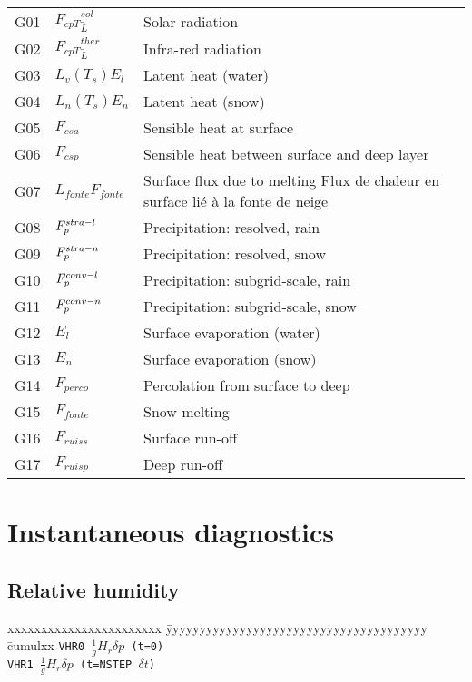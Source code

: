 \begin{itemize}
        \begin{tabular}{lll}
          G01 & ${F_{cp T}}_{\tilde{L}}^{sol}$ & Solar radiation \\
          G02 & ${F_{cp T}}_{\tilde{L}}^{ther}$ & Infra-red radiation\\
          G03 & $L_v(T_s)E_l$ & Latent heat (water) \\
          G04 & $L_n(T_s)E_n$ & Latent heat (snow) \\
          G05 & $F_{csa}$ & Sensible heat at surface \\
          G06 & $F_{csp}$ & Sensible heat between surface and deep layer \\
          G07 & $L_{fonte} F_{fonte}$ & Surface flux due to melting Flux de chaleur en surface lié à la fonte de neige \\
          G08 & $F_{p}^{stra-l}$ & Precipitation: resolved, rain \\
          G09 & $F_{p}^{stra-n}$ & Precipitation: resolved, snow \\
          G10 & $F_{p}^{conv-l}$ & Precipitation: subgrid-scale, rain \\
          G11 & $F_{p}^{conv-n}$ & Precipitation: subgrid-scale, snow \\
          G12 & $E_l$ & Surface evaporation (water) \\
          G13 & $E_n$ & Surface evaporation (snow) \\
          G14 & $F_{perco}$ & Percolation from surface to deep \\
          G15 & $F_{fonte}$ & Snow melting \\
          G16 & $F_{ruiss}$ & Surface run-off \\
          G17 & $F_{ruisp}$ & Deep run-off 
        \end{tabular}
\end{itemize}
\section{Instantaneous diagnostics }
\subsection{Relative humidity}


\begin{tabbing}
xxxxxxxxxxxxxxxxxxxxxxx \= yyyyyyyyyyyyyyyyyyyyyyyyyyyyyyyyyyyyyyy \= cumulxx \kill
\tt VHR0 \> $\frac{1}{g}H_r \delta p$ (t=0) \\[1ex]
\tt VHR1 \> $\frac{1}{g}H_r \delta p$ (t=NSTEP $\delta t$) \\[1ex]
\\[1ex]
\end{tabbing}

